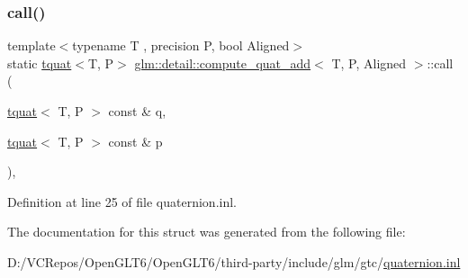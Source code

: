 \subsubsection{\texorpdfstring{call()}{call()}}
{\footnotesize\ttfamily template$<$typename T , precision P, bool Aligned$>$ \\
static \mbox{\hyperlink{structglm_1_1tquat}{tquat}}$<$T, P$>$ \mbox{\hyperlink{structglm_1_1detail_1_1compute__quat__add}{glm\+::detail\+::compute\+\_\+quat\+\_\+add}}$<$ T, P, Aligned $>$\+::call (\begin{DoxyParamCaption}\item[{\mbox{\hyperlink{structglm_1_1tquat}{tquat}}$<$ T, P $>$ const \&}]{q,  }\item[{\mbox{\hyperlink{structglm_1_1tquat}{tquat}}$<$ T, P $>$ const \&}]{p }\end{DoxyParamCaption})\hspace{0.3cm}{\ttfamily [inline]}, {\ttfamily [static]}}



Definition at line 25 of file quaternion.\+inl.



The documentation for this struct was generated from the following file\+:\begin{DoxyCompactItemize}
\item 
D\+:/\+V\+C\+Repos/\+Open\+G\+L\+T6/\+Open\+G\+L\+T6/third-\/party/include/glm/gtc/\mbox{\hyperlink{gtc_2quaternion_8inl}{quaternion.\+inl}}\end{DoxyCompactItemize}
